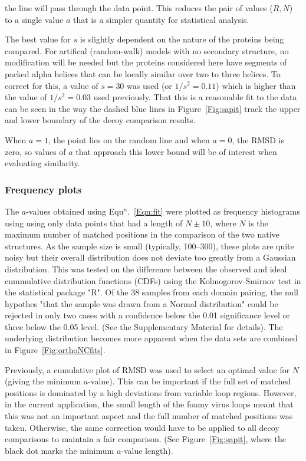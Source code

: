 \documentclass{bmcart}
\newcommand{\Fig}[1]{Figure~\ref{Fig:#1}}
\newcommand{\Eqn}[1]{Equ$^n$.~\ref{Eqn:#1}}
\begin{document}
the line will pass through the data point.  This reduces the pair of values ($R,N$) to a
single value $a$ that is a simpler quantity for statistical analysis.

The best value for $s$ is slightly dependent on the nature of the proteins being compared.
For artifical (random-walk)  models with no secondary structure, no modification will be needed but the
proteins considered here have segments of packed alpha helices that can be locally similar
over two to three helices.   To correct for this, a value of $s=30$ was used (or $1/s^2 = 0.11$)
which is higher than the value of $1/s^2 = 0.03$ used previously.
That this is a reasonable fit to the data can be seen in the way the dashed blue lines
in \Fig{sapit} track the upper and lower boundary of the decoy comparison results.

When $a=1$, the point lies on the random line and when $a=0$, the RMSD is zero, so values of
$a$ that approach this lower bound will be of interest when evaluating similarity.

\subsubsection*{Frequency plots}

The $a$-values obtained using \Eqn{fit} were plotted as frequency histograms using using
only data points that had a length of $N\pm 10$, where $N$ is the maximum number of matched
positions in the comparison of the two native structures.   As the sample size is small
(typically, 100--300), these plots are quite noisy but their overall distribution does
not deviate too greatly from a Gaussian distribution.   This was tested on the difference
between the observed and ideal cummulative distribution functions (CDFs) using the
Kolmogorov-Smirnov test in the statistical package "R".   Of the 38 samples from each
domain pairing, the null hypothes "that the sample was drawn from a Normal distribution"
could be rejected in only two cases with a confidence below the 0.01 significance level
or three below the 0.05 level.  (See the Supplementary Material for details).
The underlying distribution becomes more apparent when the data sets are combined in
\Fig{orthoNCfits}.

Previously, a cumulative plot of RMSD was used to select an optimal value for
$N$ (giving the minimum $a$-value).   This can be important if the full set of matched
positions is dominated by a high deviations from variable loop regions.   However, in the
current application, the small length of the foamy virus loops meant that this was not
an important aspect and the full number of matched positions was taken.   Otherwise, the
same correction would have to be applied to all decoy comparisons to maintain a fair
comparison.  (See \Fig{sapit}, where the black dot marks the minimum $a$-value length).
\end{document}
